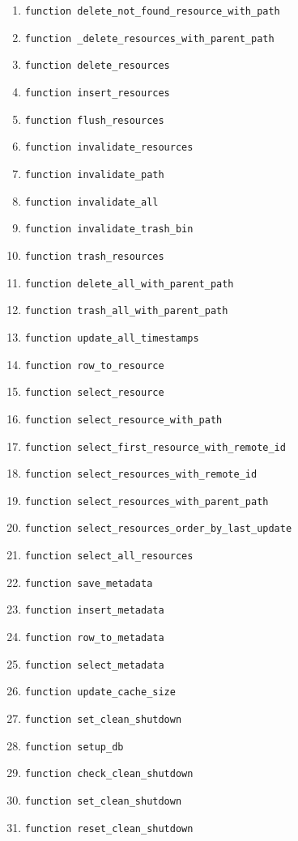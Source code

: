 \begin{enumerate}
    \item \verb|function delete_not_found_resource_with_path|
    \item \verb|function _delete_resources_with_parent_path|
    \item \verb|function delete_resources|
    \item \verb|function insert_resources|
    \item \verb|function flush_resources|
    \item \verb|function invalidate_resources|
    \item \verb|function invalidate_path|
    \item \verb|function invalidate_all|
    \item \verb|function invalidate_trash_bin|
    \item \verb|function trash_resources|
    \item \verb|function delete_all_with_parent_path|
    \item \verb|function trash_all_with_parent_path|
    \item \verb|function update_all_timestamps|
    \item \verb|function row_to_resource|
    \item \verb|function select_resource|
    \item \verb|function select_resource_with_path|
    \item \verb|function select_first_resource_with_remote_id|
    \item \verb|function select_resources_with_remote_id|
    \item \verb|function select_resources_with_parent_path|
    \item \verb|function select_resources_order_by_last_update|
    \item \verb|function select_all_resources|
    \item \verb|function save_metadata|
    \item \verb|function insert_metadata|
    \item \verb|function row_to_metadata|
    \item \verb|function select_metadata|
    \item \verb|function update_cache_size|
    \item \verb|function set_clean_shutdown|
    \item \verb|function setup_db|
    \item \verb|function check_clean_shutdown|
    \item \verb|function set_clean_shutdown|
    \item \verb|function reset_clean_shutdown|
\end{enumerate}
